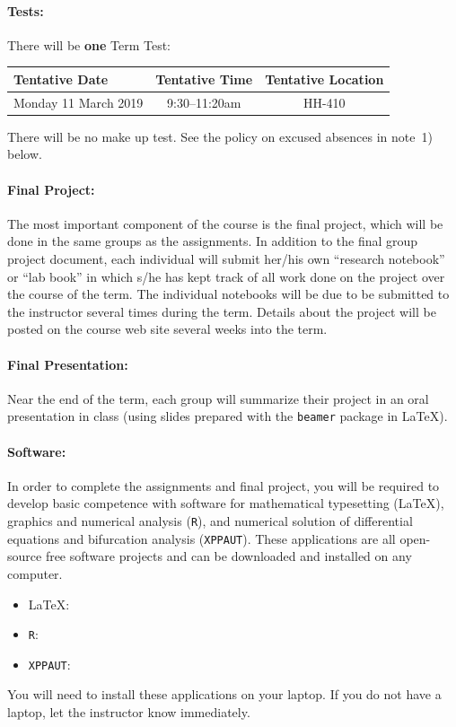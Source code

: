 \documentclass[12pt]{article}
\newcommand{\url}[1]{{\tt\textcolor{blue}{#1}}}
\begin{document}

\paragraph*{Tests:}

There will be {\bf one} Term Test:
\begin{center}
\begin{tabular}{l|c|c}
\bf Tentative Date & \bf Tentative Time & \bf Tentative Location \\\hline
Monday 11 March 2019 & 9:30--11:20am & HH-410 \\
\end{tabular}
\end{center}
\noindent
There will be no make up test. See the policy on excused absences in note~1) below.

\paragraph*{Final Project:}
The most important component of the course is the final project, which will be done in the same groups as the assignments.  In addition to the final group project document, each individual will submit her/his own ``research notebook'' or ``lab book'' in which s/he has kept track of all work done on the project over the course of the term.  The individual notebooks will be due to be submitted to the instructor several times during the term.  Details about the project will be posted on the course web site several weeks into the term.

\paragraph*{Final Presentation:}
Near the end of the term, each group will summarize their project in an oral presentation in class (using slides prepared with the {\tt beamer} package in \LaTeX).

\paragraph*{Software:} In order to complete the assignments and final project, you will be required to develop basic competence with software for mathematical typesetting (\LaTeX), graphics and numerical analysis ({\tt R}), and numerical solution of differential equations and bifurcation analysis ({\tt XPPAUT}).  These applications are all open-source free software projects and can be downloaded and installed on any computer.
\begin{itemize}\addtolength{\itemsep}{-0.5\baselineskip}
\item \LaTeX:\qquad \url{http://www.latex-project.org/}
\item {\tt R}:\qquad \url{http://www.r-project.org}
\item {\tt XPPAUT}:\qquad \url{http://www.math.pitt.edu/\~bard/xpp/xpp.html}
\end{itemize}
\noindent You will need to install these applications on your laptop.  If you do not have a laptop, let the instructor know immediately.
\end{document}

